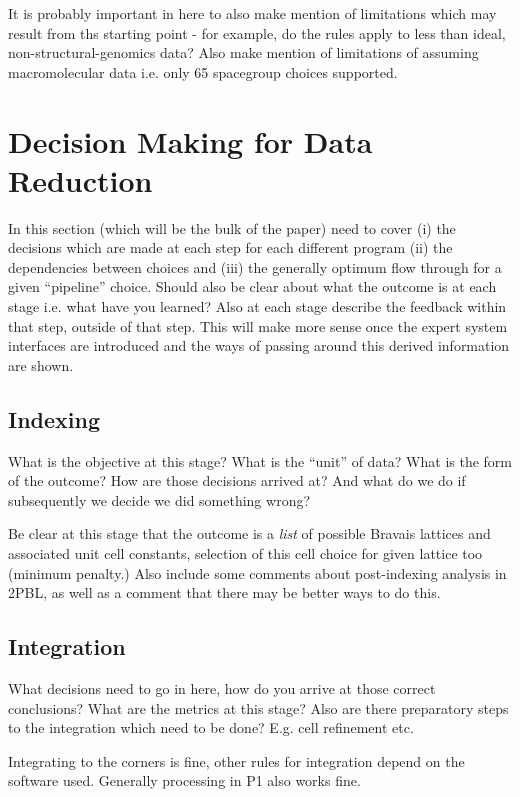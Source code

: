 \documentclass[a4paper,11pt]{article}
\begin{document}
It is probably important in here to also make mention of limitations
which may result from ths starting point - for example, do the rules
apply to less than ideal, non-structural-genomics data? Also make
mention of limitations of assuming macromolecular data i.e. only 65
spacegroup choices supported. 

\section{Decision Making for Data Reduction}

In this section (which will be the bulk of the paper) need to cover
(i) the decisions which are made at each step for each different
program (ii) the dependencies between choices and (iii) the generally
optimum flow through for a given ``pipeline'' choice. Should also be
clear about what the outcome is at each stage i.e. what have you
learned? Also at each stage describe the feedback within that step,
outside of that 
step. This will make more sense once the expert system interfaces are
introduced and the ways of passing around this derived information are shown.

\subsection{Indexing}

What is the objective at this stage? What is the ``unit'' of data?
What is the form of the outcome? How are those decisions arrived at?
And what do we do if subsequently we decide we did something wrong?

Be clear at this stage that the outcome is a \emph{list} of possible
Bravais lattices and associated unit cell constants, selection of
this cell choice for given lattice too (minimum penalty.) Also include
some comments about post-indexing analysis in 2PBL, as well as a
comment that there may be better ways to do this.

\subsection{Integration}

What decisions need to go in here, how do you arrive at those correct
conclusions? What are the metrics at this stage? Also are there
preparatory steps to the integration which need to be done? E.g. cell
refinement etc.

Integrating to the corners is fine, other rules for integration depend
on the software used. Generally processing in P1 also works fine.
\end{document}
